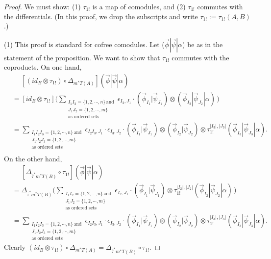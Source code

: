\begin{proof}
We must show: (1) $\tau_{1!}$ is a map of comodules, and 
(2) $\tau_{1!}$ commutes with the differentials. (In this 
proof, we drop the subscripts and write 
$\tau_{1!} := \tau_{1!}(A,B)$.)

(1) This proof is standard for cofree comodules. 
Let ($\vec{\phi} | \vec{\psi} | \alpha$) be as 
in the statement of the proposition. We want to 
show that $\tau_{1!}$ commutes with the coproducts. 
On one hand,
\begin{align*}
&\phantom{{}={}}
[(id_B \otimes \tau_{1!}) \circ 
  \Delta_{m^*T(A)}] 
  ( \vec{\phi} | \vec{\psi} | \alpha ) \\
&= [id_B \otimes \tau_{1!}]
	\big( \sum_{\substack{I_1I_2 = \{1,2,\cdots,n\} \, \textrm{and} \\ 
						  J_1J_2 = \{1,2,\cdots,m\} \\
				          \textrm{as ordered sets}}} 
    \epsilon_{I_2,J_1}\cdot 
    (\vec{\phi}_{I_1} | \vec{\psi}_{J_1}) \otimes (\vec{\phi}_{I_2} | \vec{\psi}_{J_2} | \alpha) \, \big) \\
&= \sum_{\substack{I_1I_2I_3 = \{1,2,\cdots,n\} \, \textrm{and} \\ 
				   J_1J_2J_3 = \{1,2,\cdots,m\} \\
				   \textrm{as ordered sets}}} 
    \epsilon_{I_2I_3,J_1}\cdot \epsilon_{I_3,J_2}\cdot
    (\vec{\phi}_{I_1} | \vec{\psi}_{J_1}) \otimes 
    (\vec{\phi}_{I_2} | \vec{\psi}_{J_2}) \otimes 
    \tau_{1!}^{|I_3|,|J_3|}(\vec{\phi}_{I_3} | \vec{\psi}_{J_3} | \alpha). \\
\end{align*}
On the other hand,
\begin{align*}
&\phantom{{}={}}
[\Delta_{\hat{\tau}^*m^*T(B)} 
  \circ \tau_{1!} ]
  ( \vec{\phi} | \vec{\psi} | \alpha ) \\
&= \Delta_{\hat{\tau}^*m^*T(B)}
	\big( \sum_{\substack{I_1I_2 = \{1,2,\cdots,n\} \, \textrm{and} \\ 
						  J_1J_2 = \{1,2,\cdots,m\} \\
				          \textrm{as ordered sets}}}
	\epsilon_{I_2,J_1} \cdot 
  (\vec{\phi}_{I_1} | \vec{\psi}_{J_1}) \otimes 
    \tau_{1!}^{|I_2|,|J_2|}(\vec{\phi}_{I_2} | \vec{\psi}_{J_2} | \alpha) \, \big)\\
&= \sum_{\substack{I_1I_2I_3 = \{1,2,\cdots,n\} \, \textrm{and} \\ 
				   J_1J_2J_3 = \{1,2,\cdots,m\} \\
				   \textrm{as ordered sets}}} 
    \epsilon_{I_2I_3,J_1}\cdot \epsilon_{I_3,J_2}\cdot
    (\vec{\phi}_{I_1} | \vec{\psi}_{J_1}) \otimes 
    (\vec{\phi}_{I_2} | \vec{\psi}_{J_2}) \otimes 
    \tau_{1!}^{|I_3|,|J_3|}(\vec{\phi}_{I_3} | \vec{\psi}_{J_3} | \alpha).   				          
\end{align*}
Clearly 
$(id_B \otimes \tau_{1!}) \circ 
\Delta_{m^*T(A)} = 
\Delta_{\hat{\tau}^*m^*T(B)} 
\circ \tau_{1!}$.


\end{proof}
